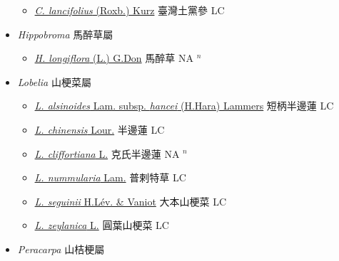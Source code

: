 \begin{itemize}
  \begin{itemize}
        \item[] \href{http://www.theplantlist.org/tpl1.1/search?q=Cyclocodon+lancifolius}{\textit{C. lancifolius} (Roxb.) Kurz}   臺灣土黨參 LC
  \end{itemize}
 \item[] \textit{Hippobroma} 馬醉草屬
                    
  \begin{itemize}
        \item[] \href{http://www.theplantlist.org/tpl1.1/search?q=Hippobroma+longiflora}{\textit{H. longiflora} (L.) G.Don}   馬醉草 NA $^n$
  \end{itemize}
 \item[] \textit{Lobelia} 山梗菜屬
                    
  \begin{itemize}
        \item[] \href{http://www.theplantlist.org/tpl1.1/search?q=Lobelia+alsinoides+subsp.+hancei}{\textit{L. alsinoides} Lam. subsp. \textit{hancei} (H.Hara) Lammers}   短柄半邊蓮 LC
        \item[] \href{http://www.theplantlist.org/tpl1.1/search?q=Lobelia+chinensis}{\textit{L. chinensis} Lour.}   半邊蓮 LC
        \item[] \href{http://www.theplantlist.org/tpl1.1/search?q=Lobelia+cliffortiana}{\textit{L. cliffortiana} L.}   克氏半邊蓮 NA $^n$
        \item[] \href{http://www.theplantlist.org/tpl1.1/search?q=Lobelia+nummularia}{\textit{L. nummularia} Lam.}   普剌特草 LC
        \item[] \href{http://www.theplantlist.org/tpl1.1/search?q=Lobelia+seguinii}{\textit{L. seguinii} H.Lév. \& Vaniot}   大本山梗菜 LC
        \item[] \href{http://www.theplantlist.org/tpl1.1/search?q=Lobelia+zeylanica}{\textit{L. zeylanica} L.}   圓葉山梗菜 LC
  \end{itemize}
 \item[] \textit{Peracarpa} 山桔梗屬
                    

\end{itemize}
